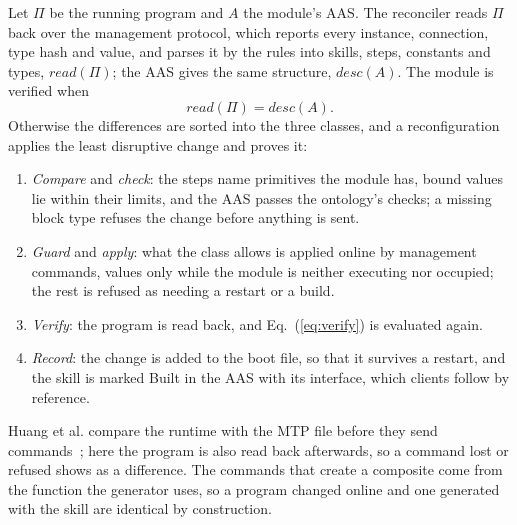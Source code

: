 Let $\Pi$ be the running program and $A$ the module's AAS. The reconciler reads $\Pi$ back over the
management protocol, which reports every instance, connection, type hash and value, and parses it by
the rules into skills, steps, constants and types, $\mathit{read}(\Pi)$; the AAS gives the same
structure, $\mathit{desc}(A)$. The module is verified when
\begin{equation}
  \mathit{read}(\Pi) = \mathit{desc}(A).
  \label{eq:verify}
\end{equation}
Otherwise the differences are sorted into the three classes, and a reconfiguration applies the least
disruptive change and proves it:
\begin{enumerate}
  \item \emph{Compare} and \emph{check}: the steps name primitives the module has, bound values lie
    within their limits, and the AAS passes the ontology's checks; a missing block type refuses the
    change before anything is sent.
  \item \emph{Guard} and \emph{apply}: what the class allows is applied online by management commands,
    values only while the module is neither executing nor occupied; the rest is refused as needing a
    restart or a build.
  \item \emph{Verify}: the program is read back, and Eq.~(\ref{eq:verify}) is evaluated again.
  \item \emph{Record}: the change is added to the boot file, so that it survives a restart, and the
    skill is marked Built in the AAS with its interface, which clients follow by reference.
\end{enumerate}

Huang et al. compare the runtime with the MTP file before they send commands~\cite{huang2026plug};
here the program is also read back afterwards, so a command lost or refused shows as a difference. The
commands that create a composite come from the function the generator uses, so a program changed
online and one generated with the skill are identical by construction.
